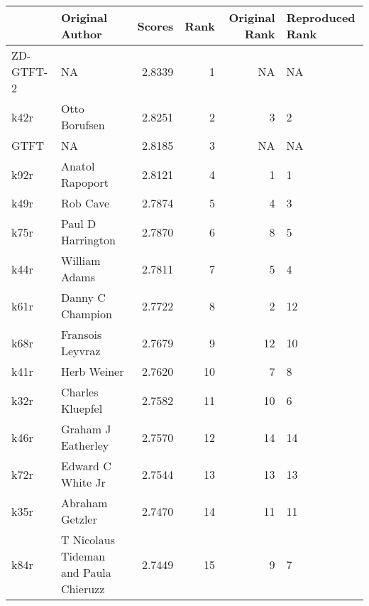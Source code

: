 \begin{tabular}{llrrrl}
\toprule
{} &                        Original Author &  Scores &  Rank &  Original Rank & Reproduced Rank \\
\midrule
ZD-GTFT-2 &                                     NA &  2.8339 &     1 &             NA &              NA \\
k42r      &                          Otto Borufsen &  2.8251 &     2 &              3 &               2 \\
GTFT      &                                     NA &  2.8185 &     3 &             NA &              NA \\
k92r      &                        Anatol Rapoport &  2.8121 &     4 &              1 &               1 \\
k49r      &                               Rob Cave &  2.7874 &     5 &              4 &               3 \\
k75r      &                      Paul D Harrington &  2.7870 &     6 &              8 &               5 \\
k44r      &                          William Adams &  2.7811 &     7 &              5 &               4 \\
k61r      &                       Danny C Champion &  2.7722 &     8 &              2 &              12 \\
k68r      &                       Fransois Leyvraz &  2.7679 &     9 &             12 &              10 \\
k41r      &                            Herb Weiner &  2.7620 &    10 &              7 &               8 \\
k32r      &                       Charles Kluepfel &  2.7582 &    11 &             10 &               6 \\
k46r      &                     Graham J Eatherley &  2.7570 &    12 &             14 &              14 \\
k72r      &                      Edward C White Jr &  2.7544 &    13 &             13 &              13 \\
k35r      &                        Abraham Getzler &  2.7470 &    14 &             11 &              11 \\
k84r      &  T Nicolaus Tideman and Paula Chieruzz &  2.7449 &    15 &              9 &               7 \\
\bottomrule
\end{tabular}

